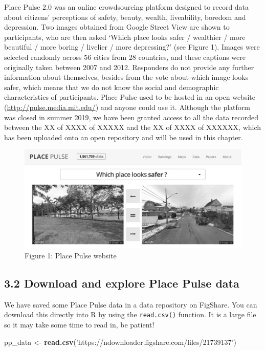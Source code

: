 \documentclass[
]{article}
\newenvironment{Shaded}{\begin{snugshade}}{\end{snugshade}}
\newcommand{\KeywordTok}[1]{\textcolor[rgb]{0.13,0.29,0.53}{\textbf{#1}}}
\newcommand{\NormalTok}[1]{#1}
\newcommand{\StringTok}[1]{\textcolor[rgb]{0.31,0.60,0.02}{#1}}
\begin{document}
Place Pulse 2.0 was an online crowdsourcing platform designed to record
data about citizens' perceptions of safety, beauty, wealth, liveability,
boredom and depression. Two images obtained from Google Street View are
shown to participants, who are then asked `Which place looks safer /
wealthier / more beautiful / more boring / livelier / more depressing?'
(see Figure 1). Images were selected randomly across 56 cities from 28
countries, and these captions were originally taken between 2007 and
2012. Responders do not provide any further information about
themselves, besides from the vote about which image looks safer, which
means that we do not know the social and demographic characteristics of
participants. Place Pulse used to be hosted in an open website
(\url{http://pulse.media.mit.edu/}) and anyone could use it. Although
the platform was closed in summer 2019, we have been granted access to
all the data recorded between the XX of XXXX of XXXXX and the XX of XXXX
of XXXXXX, which has been uploaded onto an open repository and will be
used in this chapter.

\begin{figure}
\centering
\includegraphics{figures/Place_Pulse.jpg}
\caption{Figure 1: Place Pulse website}
\end{figure}

\hypertarget{download-and-explore-place-pulse-data}{%
\subsection{3.2 Download and explore Place Pulse
data}\label{download-and-explore-place-pulse-data}}

We have saved some Place Pulse data in a data repository on FigShare.
You can download this directly into R by using the \texttt{read.csv()}
function. It is a large file so it may take some time to read in, be
patient!

\begin{Shaded}
\begin{Highlighting}[]
\NormalTok{pp_data <-}\StringTok{ }\KeywordTok{read.csv}\NormalTok{(}\StringTok{'https://ndownloader.figshare.com/files/21739137'}\NormalTok{) }
\end{Highlighting}
\end{Shaded}
\end{document}
